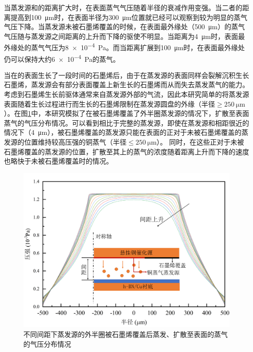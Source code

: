     当蒸发源和的距离扩大时，在表面蒸气气压随着半径的衰减作用变强。当二者的距离提高到\SI{100}{\micro\meter}时，在表面半径为\SI{300}{\micro\meter}位置就已经可以观察到较为明显的蒸气气压下降。当蒸发源未被石墨烯覆盖的时候，在表面最外缘处（\SI{500}{\micro\meter}）的蒸气气压随与蒸发源之间距离的上升而下降的驱使不明显。当距离为\SI{4}{\micro\meter}时，表面最外缘处的蒸气气压为\SI{8e-4}{\pascal}。而当距离扩展到\SI{100}{\micro\meter}时，在表面最外缘处仍可以保持大约\SI{6e-4}{\pascal}的蒸气。

    当在的表面生长了一段时间的石墨烯后，由于在蒸发源的表面同样会裂解沉积生长石墨烯，蒸发源会有部分表面覆盖上新生长的石墨烯而从而失去蒸发蒸气的能力。考虑到石墨烯生长前驱体通常来自蒸发源外部的气流，因此本研究简单的将蒸发源表面随着生长过程进行而生长的石墨烯限制在蒸发源圆盘的外缘（半径$\geqslant \SI{250}{\micro\meter}$）。在图\ref{fig:CG_FEM_halfCu}中，本研究模拟了在被石墨烯覆盖了外半圈蒸发源的情况下，扩散至表面蒸气的气压分布情况。可以看到相比于完整的蒸发源，即使在蒸发源和相距很近的情况下（\SI{4}{\micro\meter}），被石墨烯覆盖的蒸发源只能在表面的正对于未被石墨烯覆盖的蒸发源的位置维持较高压强的铜蒸气（半径$\leqslant \SI{250}{\micro\meter}$）。
    同时，在这些正对于未被石墨烯覆盖的蒸发源的位置，扩散至其上的蒸气的浓度随着距离上升而下降的速度也略快于未被石墨烯覆盖时的情况。

    \begin{figure}[htb]
        \includegraphics{pic/CG_FEM_halfCu.png}
        \caption{不同间距下蒸发源的外半圈被石墨烯覆盖后蒸发、扩散至表面的蒸气的气压分布情况}
        \label{fig:CG_FEM_halfCu}
    \end{figure}

